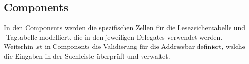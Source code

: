 \subsection{Components}

In den Components werden die spezifischen Zellen für die Lesezeichentabelle und \SEARCH-Tagtabelle modelliert, die in den jeweiligen Delegates verwendet werden. Weiterhin ist in Components die Validierung für die Addressbar definiert, welche die Eingaben in der Suchleiste überprüft und verwaltet.
